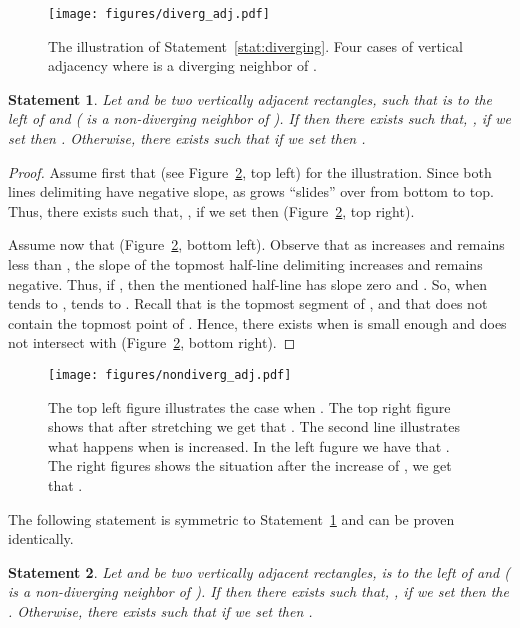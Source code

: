 \documentclass{llncs}
\newtheorem{statement}{Statement}
\begin{document}
\begin{figure}[htb]
\centering
\texttt{[image: figures/diverg\_adj.pdf]}
\caption{The illustration of Statement~\ref{stat:diverging}. Four cases of vertical adjacency where  is a diverging neighbor of .}
\label{fig:diverg_adj}
\end{figure}





\begin{statement}
\label{stat:non-diverging-above}
Let  and  be two vertically adjacent rectangles, such that  is to the left of  and  ( is a non-diverging neighbor of ). If  then  there exists  such that, ,  if we set   then .  Otherwise, there exists  such that if we set  then .
\end{statement}
\begin{proof}
Assume first that  (see Figure~\ref{fig:nondiverg_adj}, top left) for the illustration.
Since both lines delimiting  have negative slope, as  grows  ``slides'' over  
from bottom to top. Thus, there exists   such that, ,  if we set  then  (Figure~\ref{fig:nondiverg_adj}, top right). 

Assume now that   (Figure~\ref{fig:nondiverg_adj}, bottom left). Observe that as  increases and remains less than , the slope of the topmost half-line delimiting  increases and remains negative. Thus, if   , then the mentioned half-line has slope zero and . So, when  tends to ,  tends to . Recall that  is the topmost segment of , and that  does not contain the topmost point of . Hence, there exists  when  is small enough and does not intersect with  (Figure~\ref{fig:nondiverg_adj}, bottom right).  
\end{proof}

\begin{figure}[htb]
\centering
\texttt{[image: figures/nondiverg\_adj.pdf]}

\caption{The top left figure illustrates the case when .  The top right figure shows that after stretching  we get that . The second line illustrates what happens when  is increased. In the left fugure we have that  . The right figures shows the situation after the increase of , we get that .}
\label{fig:nondiverg_adj}
\end{figure}


The  following statement is symmetric to Statement~\ref{stat:non-diverging-above} and can be proven identically.
\begin{statement}
\label{stat:non-diverging-below}
Let  and  be two vertically adjacent rectangles,  is to the left of  and   ( is a non-diverging neighbor of ). If  then  there exists  such that, ,  if we set   then the .  Otherwise, there exists  such that if we set  then .
\end{statement}
\end{document}
